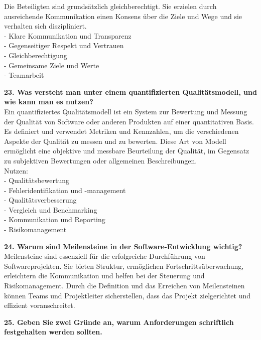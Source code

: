 \documentclass{article}
\begin{document}
Die Beteiligten sind grundsätzlich gleichberechtigt. Sie erzielen
durch ausreichende Kommunikation einen Konsens über die Ziele und Wege und sie verhalten sich diszipliniert. \\
- Klare Kommunikation und Transparenz \\
- Gegenseitiger Respekt und Vertrauen \\
- Gleichberechtigung \\
- Gemeinsame Ziele und Werte \\
- Teamarbeit\\
\textbf{23. Was versteht man unter einem quantifizierten Qualitätsmodell, und wie kann man es nutzen?}\\
Ein quantifiziertes Qualitätsmodell ist ein System zur Bewertung und Messung der Qualität von Software oder anderen Produkten auf einer quantitativen Basis. Es definiert und verwendet Metriken und Kennzahlen, um die verschiedenen Aspekte der Qualität zu messen und zu bewerten. Diese Art von Modell ermöglicht eine objektive und messbare Beurteilung der Qualität, im Gegensatz zu subjektiven Bewertungen oder allgemeinen Beschreibungen.\\
Nutzen: \\
- Qualitätsbewertung \\
- Fehleridentifikation und -management \\
- Qualitätsverbesserung \\
- Vergleich und Benchmarking \\
- Kommunikation und Reporting \\
- Risikomanagement \\
\textbf{24. Warum sind Meilensteine in der Software-Entwicklung wichtig?}\\
Meilensteine sind essenziell für die erfolgreiche Durchführung von Softwareprojekten. Sie bieten Struktur, ermöglichen Fortschrittsüberwachung, erleichtern die Kommunikation und helfen bei der Steuerung und Risikomanagement. Durch die Definition und das Erreichen von Meilensteinen können Teams und Projektleiter sicherstellen, dass das Projekt zielgerichtet und effizient voranschreitet. \\
\textbf{25. Geben Sie zwei Gründe an, warum Anforderungen schriftlich festgehalten werden sollten.}\\
\end{document}
